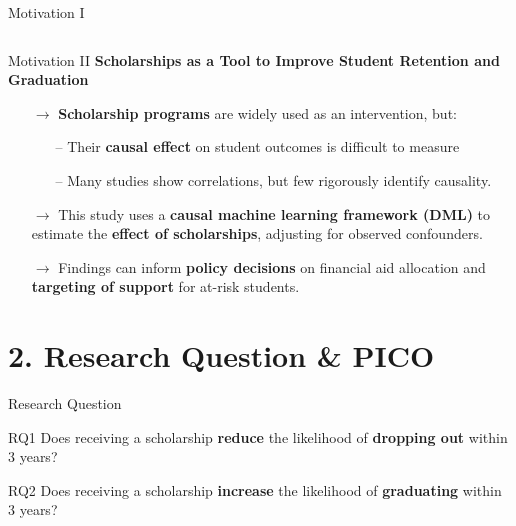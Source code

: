 \documentclass[aspectratio=169]{beamer}
\begin{document}
\begin{frame}{Motivation I}
\begin{columns}
\end{columns}

  	
  \end{frame}
  
  \begin{frame}{Motivation II}
  	\textbf{Scholarships as a Tool to Improve Student Retention and Graduation}
  	
  	\begin{itemize}
  		\item [$\rightarrow$]  \textbf{Scholarship programs} are widely used as an intervention, but:
  		\begin{itemize}
  		  		\item [--] Their  \textbf{causal effect} on student outcomes is difficult to measure
  		  		\item [--] Many studies show correlations, but few rigorously identify causality.
   		\end{itemize}
   		\item [$\rightarrow$] This study uses a \textbf{causal machine learning framework (DML)} to estimate the  \textbf{effect of scholarships}, adjusting for observed confounders.
   		\item [$\rightarrow$] Findings can inform \textbf{policy decisions} on financial aid allocation and \textbf{targeting of support} for at-risk students.
  	\end{itemize}
  \end{frame}
  
  
 \section{2. Research Question \& PICO}
  
    \begin{frame}{Research Question}
    \begin{alertblock}{RQ1}
	Does receiving a scholarship \textbf{reduce} the likelihood of \textbf{dropping out} within 3 years?
\end{alertblock}
\vspace{10pt}
    \begin{alertblock}{RQ2}
	Does receiving a scholarship \textbf{increase} the likelihood of \textbf{graduating} within 3 years?
\end{alertblock}
  \end{frame}
  
\end{document}
